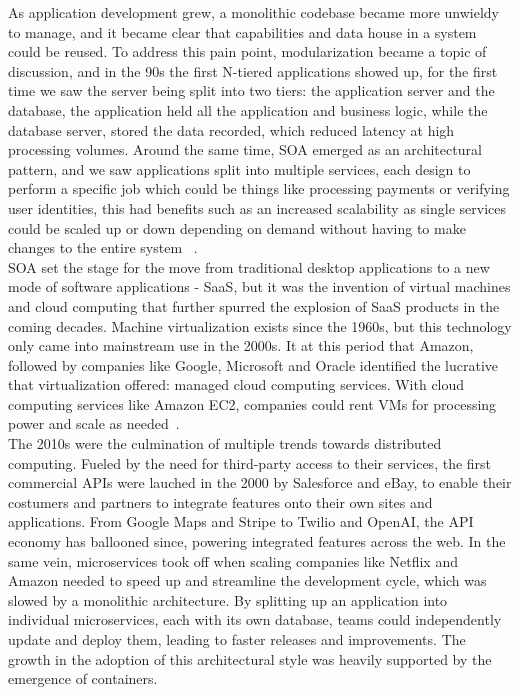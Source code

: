 As application development grew, a monolithic codebase became more unwieldy to manage, and it became clear that
capabilities and data house in a system could be reused.
To address this pain point, modularization became a topic of discussion, and in the 90s the first N-tiered
applications showed up, for the first time we saw the server being split into two tiers: the application server and
the database, the application held all the application and business logic, while the database server, stored the
data recorded, which reduced latency at high processing volumes.
Around the same time, \ac{SOA} emerged as an architectural pattern, and we saw applications split into multiple
services, each design to perform a specific job which could be things like processing payments or verifying user
identities, this had benefits such as an increased scalability as single services could be scaled up or down
depending on demand without having to make changes to the entire system
~\cite{orkes_software_architecture_evolution, oracle_soa, port_soa}.\\

\ac{SOA} set the stage for the move from traditional desktop applications to a new mode of software applications - \ac{SaaS},
but it was the invention of virtual machines and cloud computing that further spurred the explosion of \ac{SaaS}
products in the coming decades.
Machine virtualization exists since the 1960s, but this technology only came into
mainstream use in the 2000s.
It at this period that Amazon, followed by companies like Google, Microsoft and Oracle identified the lucrative that
virtualization offered: managed cloud computing services.
With cloud computing services like Amazon \ac{EC2}, companies could rent \ac{VM}s for processing power and scale as
needed~\cite{orkes_software_architecture_evolution}.\\

The 2010s were the culmination of multiple trends towards distributed computing.
Fueled by the need for third-party access to their services, the first commercial \ac{API}s were lauched in the
2000 by Salesforce and eBay, to enable their costumers and partners to integrate features onto their own sites and
applications.
From Google Maps and Stripe to Twilio and OpenAI, the \ac{API} economy has ballooned since, powering integrated
features across the web.
In the same vein, microservices took off when scaling companies like Netflix and Amazon needed to speed up and
streamline the development cycle, which was slowed by a monolithic architecture.
By splitting up an application into individual microservices, each with its own database, teams could independently update and deploy them, leading to
faster releases and improvements.\cite{orkes_software_architecture_evolution}
The growth in the adoption of this architectural style was heavily supported by the emergence of containers.\\

